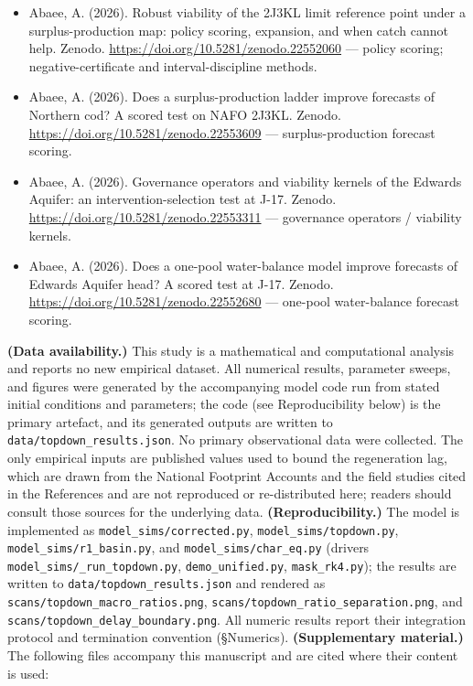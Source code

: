 \documentclass[11pt]{article}
\begin{document}
\begin{itemize}
\item Abaee, A. (2026). Robust viability of the 2J3KL limit reference point under a surplus-production map: policy scoring, expansion, and when catch cannot help. Zenodo. \url{https://doi.org/10.5281/zenodo.22552060} — policy scoring; negative-certificate and interval-discipline methods.
\item Abaee, A. (2026). Does a surplus-production ladder improve forecasts of Northern cod? A scored test on NAFO 2J3KL. Zenodo. \url{https://doi.org/10.5281/zenodo.22553609} — surplus-production forecast scoring.
\item Abaee, A. (2026). Governance operators and viability kernels of the Edwards Aquifer: an intervention-selection test at J-17. Zenodo. \url{https://doi.org/10.5281/zenodo.22553311} — governance operators / viability kernels.
\item Abaee, A. (2026). Does a one-pool water-balance model improve forecasts of Edwards Aquifer head? A scored test at J-17. Zenodo. \url{https://doi.org/10.5281/zenodo.22552680} — one-pool water-balance forecast scoring.
\end{itemize}

\textbf{(Data availability.)} This study is a mathematical and computational analysis and reports no new empirical dataset. All numerical results, parameter sweeps, and figures were generated by the accompanying model code run from stated initial conditions and parameters; the code (see Reproducibility below) is the primary artefact, and its generated outputs are written to \texttt{data/topdown\_results.json}. No primary observational data were collected. The only empirical inputs are published values used to bound the regeneration lag, which are drawn from the National Footprint Accounts and the field studies cited in the References and are not reproduced or re-distributed here; readers should consult those sources for the underlying data. \textbf{(Reproducibility.)} The model is implemented as \texttt{model\_sims/corrected.py}, \texttt{model\_sims/topdown.py}, \texttt{model\_sims/r1\_basin.py}, and \texttt{model\_sims/char\_eq.py} (drivers \texttt{model\_sims/\_run\_topdown.py}, \texttt{demo\_unified.py}, \texttt{mask\_rk4.py}); the results are written to \texttt{data/topdown\_results.json} and rendered as \texttt{scans/topdown\_macro\_ratios.png}, \texttt{scans/topdown\_ratio\_separation.png}, and \texttt{scans/topdown\_delay\_boundary.png}. All numeric results report their integration protocol and termination convention (§Numerics). \textbf{(Supplementary material.)} The following files accompany this manuscript and are cited where their content is used:
\end{document}
